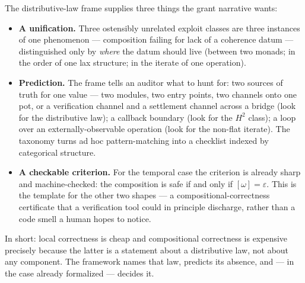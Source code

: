 \documentclass[11pt]{amsart}
\theoremstyle{definition}
\theoremstyle{remark}
\begin{document}
The distributive-law frame supplies three things the grant narrative wants:
\begin{itemize}[leftmargin=1.4em]
  \item \textbf{A unification.} Three ostensibly unrelated exploit classes are three instances of
        one phenomenon --- composition failing for lack of a coherence datum --- distinguished
        only by \emph{where} the datum should live (between two monads; in the order of one lax
        structure; in the iterate of one operation).
  \item \textbf{Prediction.} The frame tells an auditor what to hunt for: two sources of truth
        for one value --- two modules, two entry points, two channels onto one pot, or a
        verification channel and a settlement channel across a bridge (look for
        the distributive law); a callback boundary (look for the $H^2$
        class); a loop over an externally-observable operation (look for the non-flat iterate).
        The taxonomy turns ad hoc pattern-matching into a checklist indexed by categorical
        structure.
  \item \textbf{A checkable criterion.} For the temporal case the criterion is already sharp and
        machine-checked: the composition is safe if and only if $[\omega]=\varepsilon$. This is
        the template for the other two shapes --- a compositional-correctness certificate that a
        verification tool could in principle discharge, rather than a code smell a human hopes to
        notice.
\end{itemize}

In short: local correctness is cheap and compositional correctness is expensive precisely because
the latter is a statement about a distributive law, not about any component. The framework names
that law, predicts its absence, and --- in the case already formalized --- decides it.
\end{document}
